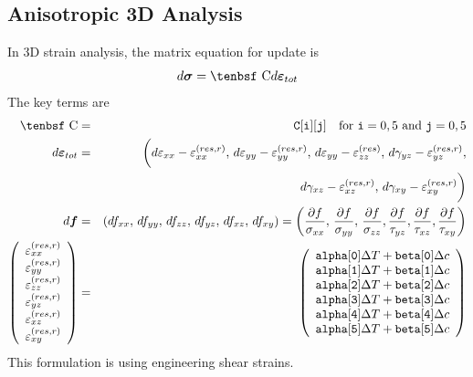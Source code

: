 \documentclass[11pt]{article}
\renewcommand{\vec}[1]{\boldsymbol{#1}}
\def\C{\hbox{\tenbsf C}}
\def\code#1{{\small\tt #1}}
\def\deff{d \vec{\varepsilon}_{tot}}
\def\df{d \vec{f}}
\def\dsig{d \vec{\sigma}}
\def\DT{\Delta T}
\def\e#1{\varepsilon_{#1}}
\def\er#1{\varepsilon_{#1}^{(res)}}
\def\err#1{\varepsilon_{#1}^{(res,r)}}
\def\g#1{\gamma_{#1}}
\begin{document}
\subsection{Anisotropic 3D Analysis}

In 3D strain analysis, the matrix equation for update is
\begin{equation}
    \dsig = \C \deff 
\end{equation}
The key terms are
\begin{eqnarray}
      \C & = & \code{C[i][j]} \quad {\rm for\ }\code{i}=0,5\ {\rm and\ }\code{j}=0,5 \\
       \deff & = & \biggl(d\e{xx} - \err{xx}, \thinspace d\e{yy} - \err{yy}, \thinspace  d\e{yy}-  \er{zz}, 
             \thinspace d\g{yz}-\err{yz},  \nonumber\\
             && \qquad\mbox{} \thinspace d\g{xz}-\err{xz},  \thinspace d\g{xy}-\err{xy}\biggr) \\
      \df & = & (df_{xx}, \thinspace df_{yy}, \thinspace df_{zz}, \thinspace df_{yz}, \thinspace df_{xz}, \thinspace df_{xy})
                  = \left({\partial f\over \sigma_{xx}}, \thinspace {\partial f\over \sigma_{yy}}, \thinspace {\partial f\over \sigma_{zz}},
                                {\partial f\over \tau_{yz}}, {\partial f\over \tau_{xz}}, {\partial f\over \tau_{xy}}\right)  \\
\left(\begin{array}{c} \err{xx} \\ \err{yy} \\ \err{zz} \\  \err{yz} \\ \err{xz} \\ \err{xy} \end{array}\right)
       & = &  \left(\begin{array}{c}
	\code{alpha[0]}\DT + \code{beta[0]}\Delta c \\
	\code{alpha[1]}\DT + \code{beta[1]}\Delta c \\
	\code{alpha[2]}\DT + \code{beta[2]}\Delta c \\
	\code{alpha[3]}\DT + \code{beta[3]}\Delta c \\
	\code{alpha[4]}\DT + \code{beta[4]}\Delta c \\
	\code{alpha[5]}\DT + \code{beta[5]}\Delta c 
 \end{array}\right) 
 \end{eqnarray}
This formulation is using engineering shear strains. 
 
\end{document}
